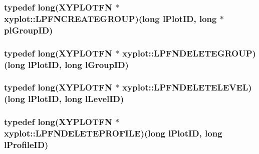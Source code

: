 \hypertarget{namespacexyplot_ab1a3054ba818e5b40da27a562af9714c}{
\subsubsection[{L\-P\-F\-N\-C\-R\-E\-A\-T\-E\-G\-R\-O\-U\-P}]{\setlength{\rightskip}{0pt plus 5cm}typedef {\bf long}({\bf X\-Y\-P\-L\-O\-T\-F\-N} $\ast$ xyplot\-::\-L\-P\-F\-N\-C\-R\-E\-A\-T\-E\-G\-R\-O\-U\-P)({\bf long} l\-Plot\-I\-D, {\bf long} $\ast$pl\-Group\-I\-D)}}\label{namespacexyplot_ab1a3054ba818e5b40da27a562af9714c}
\hypertarget{namespacexyplot_a17ee39c2695e1c7c78048d0672744524}{
\subsubsection[{L\-P\-F\-N\-D\-E\-L\-E\-T\-E\-G\-R\-O\-U\-P}]{\setlength{\rightskip}{0pt plus 5cm}typedef {\bf long}({\bf X\-Y\-P\-L\-O\-T\-F\-N} $\ast$ xyplot\-::\-L\-P\-F\-N\-D\-E\-L\-E\-T\-E\-G\-R\-O\-U\-P)({\bf long} l\-Plot\-I\-D, {\bf long} l\-Group\-I\-D)}}\label{namespacexyplot_a17ee39c2695e1c7c78048d0672744524}
\hypertarget{namespacexyplot_a96f2d0955d7feb162b2730e65398ed64}{
\subsubsection[{L\-P\-F\-N\-D\-E\-L\-E\-T\-E\-L\-E\-V\-E\-L}]{\setlength{\rightskip}{0pt plus 5cm}typedef {\bf long}({\bf X\-Y\-P\-L\-O\-T\-F\-N} $\ast$ xyplot\-::\-L\-P\-F\-N\-D\-E\-L\-E\-T\-E\-L\-E\-V\-E\-L)({\bf long} l\-Plot\-I\-D, {\bf long} l\-Level\-I\-D)}}\label{namespacexyplot_a96f2d0955d7feb162b2730e65398ed64}
\hypertarget{namespacexyplot_af6412b804e2c4c568501d1a6e84358cd}{
\subsubsection[{L\-P\-F\-N\-D\-E\-L\-E\-T\-E\-P\-R\-O\-F\-I\-L\-E}]{\setlength{\rightskip}{0pt plus 5cm}typedef {\bf long}({\bf X\-Y\-P\-L\-O\-T\-F\-N} $\ast$ xyplot\-::\-L\-P\-F\-N\-D\-E\-L\-E\-T\-E\-P\-R\-O\-F\-I\-L\-E)({\bf long} l\-Plot\-I\-D, {\bf long} {\bf l\-Profile\-I\-D})}}\label{namespacexyplot_af6412b804e2c4c568501d1a6e84358cd}

